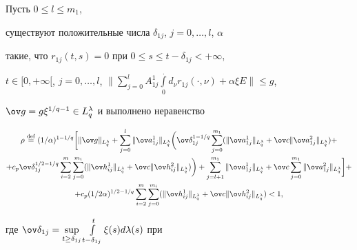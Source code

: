 \begin{thm}


Пусть $0 \le l \le m_1$, 


существуют положительные числа $\delta_{1j}$, $j = 0,\dotsc, l$, $\alpha$ 


такие, что $r_{1j}(t,s) = 0$ при $0 \le s \le t - \delta_{1j} < +\infty$, 


$t \in [0, +\infty [$, $j = 0,\dotsc, l$, $\Big\|\sum \limits_{j=0}^l


A_{1j}^1\int \limits_0^{\displaystyle .}d_\nu r_{1j}(\cdot,\nu )


+ \alpha \xi E\Big\| \le g$, 


$\ov g = g\xi^{1/q-1} \in L_q^\lambda $ и выполнено неравенство


\begin{multline*}


\rho \overset{\mathrm{def}}{=}{} (1/\alpha )^{1-1/q}


\bigg[\|\ov g\|_{L_q^\lambda } + 


\sum \limits_{j=0}^l\|\ov a_{1j}^1\|_{L_q^\lambda }


\bigg(\ov \delta_{1j}^{1-1/q}


\sum \limits_{j=0}^{m_1}(\|\ov a_{1j}^1\|_{L_q^\lambda } + 


\ov c\|\ov a_{1j}^2\|_{L_q^\lambda }) + \\


%


+ c_p\ov \delta_{1j}^{1/2-1/q}\sum \limits_{i=2}^m


\sum\limits_{j=0}^{m_i}(\|\ov h_{ij}^1\|_{L_q^\lambda } + 


\ov c\|\ov h_{ij}^2\|_{L_q^\lambda })\bigg) + 


\sum \limits_{j=l+1}^{m_1}\|\ov a_{1j}^1\|_{L_q^\lambda } + 


\ov c\sum \limits_{j=0}^{m_1}\|\ov a_{1j}^2\|_{L_q^\lambda }\bigg] + \\


%


+ c_p(1/2\alpha )^{1/2-1/q}\sum \limits_{i=2}^m


\sum \limits_{j=0}^{m_i}(


\|\ov h_{ij}^1\|_{L_q^\lambda } +


\ov c\|\ov h_{ij}^2\|_{L_q^\lambda }) < 1,


\end{multline*}


где $\ov \delta_{1j} = \sup \limits_{t\ge \delta_{1j}}


\int \limits_{t-\delta_{1j}}^t\xi (s)d\lambda (s)$ при 



\end{thm}
